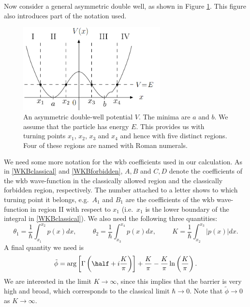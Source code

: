\documentclass[12pt]{article}
\begin{document}
Now consider a general asymmetric double well, as shown in Figure \ref{doublewell2}. This figure also introduces part of the notation used.
\begin{figure}[H]
\begin{center}
\includegraphics[width=7.5cm]{doublewell2.png}
\caption{An asymmetric double-well potential $V$. The minima are $a$ and $b$.
We assume that the particle has energy $E$. This provides us with turning points $x_1$, $x_2$, $x_3$ and $x_4$ and hence with five distinct regions.
Four of these regions are named with Roman numerals.}
\label{doublewell2}
\end{center}
\end{figure}
We need some more notation for the {\sc wkb} coefficients used in our calculation.
As in \eqref{WKBclassical} and \eqref{WKBforbidden}, $A,B$ and $C,D$ denote the coefficients of the {\sc wkb} wave-function in the classically allowed region and the classically forbidden region, respectively.
The number attached to a letter shows to which turning point it belongs, e.g.\ $A_1$ and $B_1$ are the coefficients of the {\sc wkb} wave-function in region II with respect to $x_1$ (i.e.\ $x_1$ is the lower boundary of the integral in \eqref{WKBclassical}).
We also need the following three quantities:
\begin{equation}
\theta_1=\frac{1}{\hbar}\int^{x_2}_{x_1}p(x)dx, \hspace{1cm} \theta_2=\frac{1}{\hbar}\int^{x_4}_{x_3}p(x)dx,
\hspace{1cm} K=\frac{1}{\hbar}\int^{x_3}_{x_2}|p(x)|dx.
\end{equation}
A final quantity we need is
\begin{equation}
\tilde{\phi}=\arg{\left[\Gamma\left(\half+i\frac{K}{\pi}\right)\right]}+\frac{K}{\pi}-\frac{K}{\pi}\ln\left(\frac{K}{\pi}\right).
\label{constantsWKB}
\end{equation}
We are interested in the limit $K\rightarrow\infty$, since this implies that the barrier is very high and broad, which corresponds to the classical limit $\hbar\rightarrow0$.
Note that $\tilde{\phi}\rightarrow 0$ as $K\rightarrow\infty$.
\end{document}
